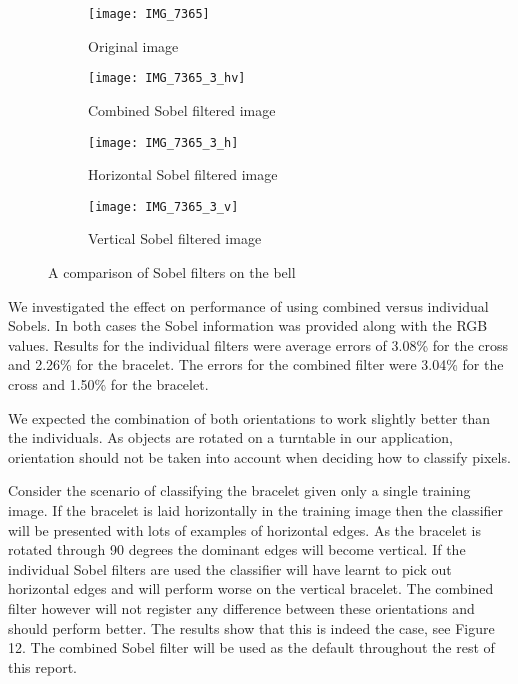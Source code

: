 \documentclass[12pt]{IIBproject}
\begin{document}
\begin{figure}[H]
\centering
\begin{subfigure}{.45\textwidth}
  \centering
  \texttt{[image: IMG\_7365]}
  \caption{Original image}
  \label{fig:sub1}
\end{subfigure}%
\begin{subfigure}{.45\textwidth}
  \centering
  \texttt{[image: IMG\_7365\_3\_hv]}
  \caption{Combined Sobel filtered image}
  \label{fig:sub2}
\end{subfigure}
\begin{subfigure}{.45\textwidth}
  \centering
  \texttt{[image: IMG\_7365\_3\_h]}
  \caption{Horizontal Sobel filtered image}
  \label{fig:sub2}
\end{subfigure}
\begin{subfigure}{.45\textwidth}
  \centering
  \texttt{[image: IMG\_7365\_3\_v]}
  \caption{Vertical Sobel filtered image}
  \label{fig:sub2}
\end{subfigure}
\caption{A comparison of Sobel filters on the bell}
\label{fig:test}
\end{figure}


We investigated the effect on performance of using combined versus individual Sobels. In both cases the Sobel information was provided along with the RGB values. Results for the individual filters were average errors of 3.08\% for the cross and 2.26\% for the bracelet. The errors for the combined filter were 3.04\% for the cross and 1.50\% for the bracelet. 

We expected the combination of both orientations to work slightly better than the individuals. As objects are rotated on a turntable in our application, orientation should not be taken into account when deciding how to classify pixels. 

Consider the scenario of classifying the bracelet given only a single training image. If the bracelet is laid horizontally in the training image then the classifier will be presented with lots of examples of horizontal edges. As the bracelet is rotated through 90 degrees the dominant edges will become vertical. If the individual Sobel filters are used the classifier will have learnt to pick out horizontal edges and will perform worse on the vertical bracelet. The combined filter however will not register any difference between these orientations and should perform better. The results show that this is indeed the case, see Figure 12. The combined Sobel filter will be used as the default throughout the rest of this report.
\end{document}
